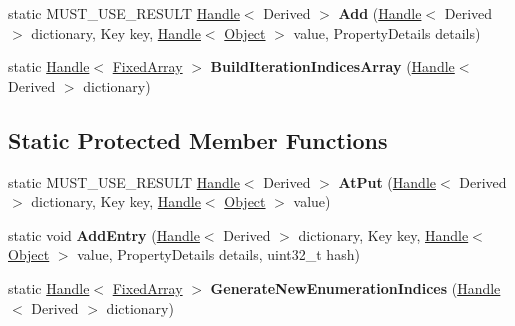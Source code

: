 \begin{DoxyCompactItemize}
\item 
static M\+U\+S\+T\+\_\+\+U\+S\+E\+\_\+\+R\+E\+S\+U\+LT \hyperlink{classv8_1_1internal_1_1_handle}{Handle}$<$ Derived $>$ {\bfseries Add} (\hyperlink{classv8_1_1internal_1_1_handle}{Handle}$<$ Derived $>$ dictionary, Key key, \hyperlink{classv8_1_1internal_1_1_handle}{Handle}$<$ \hyperlink{classv8_1_1internal_1_1_object}{Object} $>$ value, Property\+Details details)\hypertarget{classv8_1_1internal_1_1_dictionary_a6888a0be89612ae10da310bae830517d}{}\label{classv8_1_1internal_1_1_dictionary_a6888a0be89612ae10da310bae830517d}

\item 
static \hyperlink{classv8_1_1internal_1_1_handle}{Handle}$<$ \hyperlink{classv8_1_1internal_1_1_fixed_array}{Fixed\+Array} $>$ {\bfseries Build\+Iteration\+Indices\+Array} (\hyperlink{classv8_1_1internal_1_1_handle}{Handle}$<$ Derived $>$ dictionary)\hypertarget{classv8_1_1internal_1_1_dictionary_a317b86ba6047426243e775e9c8a8de9d}{}\label{classv8_1_1internal_1_1_dictionary_a317b86ba6047426243e775e9c8a8de9d}

\end{DoxyCompactItemize}
\subsection*{Static Protected Member Functions}
\begin{DoxyCompactItemize}
\item 
static M\+U\+S\+T\+\_\+\+U\+S\+E\+\_\+\+R\+E\+S\+U\+LT \hyperlink{classv8_1_1internal_1_1_handle}{Handle}$<$ Derived $>$ {\bfseries At\+Put} (\hyperlink{classv8_1_1internal_1_1_handle}{Handle}$<$ Derived $>$ dictionary, Key key, \hyperlink{classv8_1_1internal_1_1_handle}{Handle}$<$ \hyperlink{classv8_1_1internal_1_1_object}{Object} $>$ value)\hypertarget{classv8_1_1internal_1_1_dictionary_a600bf7c2263f46de39c7ffcf7b9f0446}{}\label{classv8_1_1internal_1_1_dictionary_a600bf7c2263f46de39c7ffcf7b9f0446}

\item 
static void {\bfseries Add\+Entry} (\hyperlink{classv8_1_1internal_1_1_handle}{Handle}$<$ Derived $>$ dictionary, Key key, \hyperlink{classv8_1_1internal_1_1_handle}{Handle}$<$ \hyperlink{classv8_1_1internal_1_1_object}{Object} $>$ value, Property\+Details details, uint32\+\_\+t hash)\hypertarget{classv8_1_1internal_1_1_dictionary_ae20fc319658ca31c6c045487f8096f1b}{}\label{classv8_1_1internal_1_1_dictionary_ae20fc319658ca31c6c045487f8096f1b}

\item 
static \hyperlink{classv8_1_1internal_1_1_handle}{Handle}$<$ \hyperlink{classv8_1_1internal_1_1_fixed_array}{Fixed\+Array} $>$ {\bfseries Generate\+New\+Enumeration\+Indices} (\hyperlink{classv8_1_1internal_1_1_handle}{Handle}$<$ Derived $>$ dictionary)\hypertarget{classv8_1_1internal_1_1_dictionary_a8449610555f21b2a3dcbdf7fa8906058}{}\label{classv8_1_1internal_1_1_dictionary_a8449610555f21b2a3dcbdf7fa8906058}

\end{DoxyCompactItemize}
